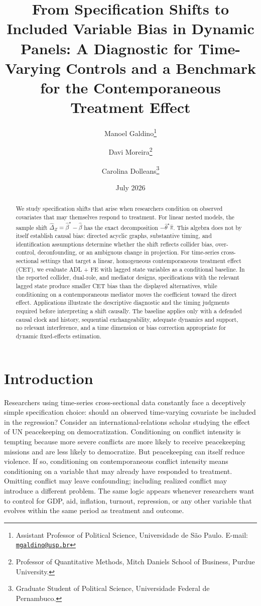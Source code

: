\documentclass[
]{article}
\title{From Specification Shifts to Included Variable Bias in Dynamic
Panels: A Diagnostic for Time-Varying Controls and a Benchmark for the
Contemporaneous Treatment Effect}
\author{Manoel Galdino\footnote{Assistant Professor of Political
  Science, Universidade de São Paulo. E-mail:
  \href{mailto:mgaldino@usp.br}{\nolinkurl{mgaldino@usp.br}}} \and Davi
Moreira\footnote{Professor of Quantitative Methods, Mitch Daniels School
  of Business, Purdue University.} \and Carolina Dolleans\footnote{Graduate
  Student of Political Science, Universidade Federal de Pernambuco.}}
\date{July 2026}
\begin{document}
\maketitle
\begin{abstract}
We study specification shifts that arise when researchers condition on
observed covariates that may themselves respond to treatment. For linear
nested models, the sample shift
\(\widehat{\Delta}_Z=\widehat{\beta}^{\star}-\widehat{\beta}\) has the
exact decomposition \(-\widehat{\theta}^{\star}\widehat{\pi}\). This
algebra does not by itself establish causal bias: directed acyclic
graphs, substantive timing, and identification assumptions determine
whether the shift reflects collider bias, over-control, deconfounding,
or an ambiguous change in projection. For time-series cross-sectional
settings that target a linear, homogeneous contemporaneous treatment
effect (CET), we evaluate ADL + FE with lagged state variables as a
conditional baseline. In the reported collider, dual-role, and mediator
designs, specifications with the relevant lagged state produce smaller
CET bias than the displayed alternatives, while conditioning on a
contemporaneous mediator moves the coefficient toward the direct effect.
Applications illustrate the descriptive diagnostic and the timing
judgments required before interpreting a shift causally. The baseline
applies only with a defended causal clock and history, sequential
exchangeability, adequate dynamics and support, no relevant
interference, and a time dimension or bias correction appropriate for
dynamic fixed-effects estimation.
\end{abstract}

\section{Introduction}\label{introduction}

Researchers using time-series cross-sectional data constantly face a
deceptively simple specification choice: should an observed time-varying
covariate be included in the regression? Consider an
international-relations scholar studying the effect of UN peacekeeping
on democratization. Conditioning on conflict intensity is tempting
because more severe conflicts are more likely to receive peacekeeping
missions and are less likely to democratize. But peacekeeping can itself
reduce violence. If so, conditioning on contemporaneous conflict
intensity means conditioning on a variable that may already have
responded to treatment. Omitting conflict may leave confounding;
including realized conflict may introduce a different problem. The same
logic appears whenever researchers want to control for GDP, aid,
inflation, turnout, repression, or any other variable that evolves
within the same period as treatment and outcome.
\end{document}

